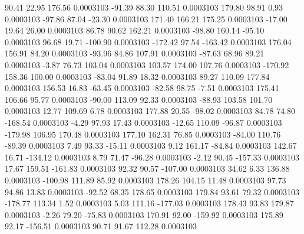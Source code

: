        90.41       22.95      176.56     0.0003103
      -91.39       88.30      110.51     0.0003103
      179.80       98.91        0.93     0.0003103
      -97.86       87.04      -23.30     0.0003103
      171.40      166.21      175.25     0.0003103
      -17.00       19.64       26.00     0.0003103
       86.78       90.62      162.21     0.0003103
      -98.80      160.14      -95.10     0.0003103
       96.68       19.71     -100.90     0.0003103
     -172.42       97.54     -163.42     0.0003103
      176.04      156.91       84.20     0.0003103
      -93.96       84.86      107.91     0.0003103
      -87.63       68.96       89.21     0.0003103
       -3.87       76.73      103.04     0.0003103
      103.57      174.00      107.76     0.0003103
     -170.92      158.36      100.00     0.0003103
      -83.04       91.89       18.32     0.0003103
       89.27      110.09      177.84     0.0003103
      156.53       16.83      -63.45     0.0003103
      -82.58       98.75       -7.51     0.0003103
      175.41      106.66       95.77     0.0003103
      -90.00      113.09       92.33     0.0003103
      -88.93      103.58      101.70     0.0003103
       12.77      109.69        6.78     0.0003103
      177.88       20.55      -98.02     0.0003103
       84.78       74.80     -168.54     0.0003103
       -4.29       97.93       17.43     0.0003103
      -12.65      110.09      -96.87     0.0003103
     -179.98      106.95      170.48     0.0003103
      177.10      162.31       76.85     0.0003103
      -84.00      110.76      -89.39     0.0003103
        7.49       93.33      -15.11     0.0003103
        9.12      161.17      -84.84     0.0003103
      142.67       16.71     -134.12     0.0003103
        8.79       71.47      -96.28     0.0003103
       -2.12       90.45     -157.33     0.0003103
       17.67      159.51     -161.83     0.0003103
       92.32       90.57     -107.00     0.0003103
       34.62        6.33      136.88     0.0003103
     -100.98      111.89       85.92     0.0003103
      178.26      104.15       11.48     0.0003103
       97.73       94.86       13.83     0.0003103
      -92.52       68.35      178.65     0.0003103
      179.84       93.61       79.32     0.0003103
     -178.77      113.34        1.52     0.0003103
        5.03      111.16     -177.03     0.0003103
      178.43       93.83      179.87     0.0003103
       -2.26       79.20      -75.83     0.0003103
      170.91       92.00     -159.92     0.0003103
      175.89       92.17     -156.51     0.0003103
       90.71       91.67      112.28     0.0003103
